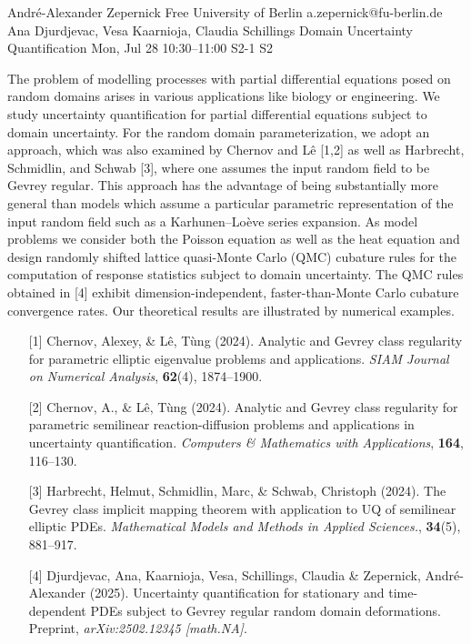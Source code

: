 \begin{talk}
  {André-Alexander Zepernick}%
  {Free University of Berlin}%
  {a.zepernick@fu-berlin.de}%
  {Ana Djurdjevac, Vesa Kaarnioja, Claudia Schillings}%
  {Domain Uncertainty Quantification}%
  {}%
  {Mon, Jul 28 10:30–11:00}%
  {S2-1}%
  {S2}%

The problem of modelling processes with partial differential equations posed on random domains arises in various applications like biology or engineering. We study uncertainty quantification for partial differential equations subject to domain uncertainty. For the random domain parameterization, we adopt an approach, which was also examined by Chernov and L\^{e} [1,2] as well as Harbrecht, Schmidlin, and Schwab [3], where one assumes the input random field to be Gevrey regular. This approach has the advantage of being substantially more general than models which assume a particular parametric representation of the input random field such as a Karhunen--Lo\`eve series expansion. As model problems we consider both the Poisson equation as well as the heat equation and design randomly shifted lattice quasi-Monte Carlo (QMC) cubature rules for the computation of response statistics subject to domain uncertainty. The QMC rules obtained in [4] exhibit dimension-independent, faster-than-Monte Carlo cubature convergence rates. Our theoretical results are illustrated by numerical examples.
\begin{enumerate}
    \item[{[1]}] Chernov, Alexey, \& L\^{e}, Tùng (2024). Analytic and Gevrey class regularity for parametric elliptic eigenvalue problems and applications. \emph{SIAM Journal on Numerical Analysis}, \textbf{62}(4), 1874--1900.
    \item[{[2]}] Chernov, A., \& L\^{e}, Tùng (2024). Analytic and Gevrey class regularity for parametric semilinear reaction-diffusion problems and applications in uncertainty quantification. \emph{Computers \& Mathematics with Applications}, \textbf{164}, 116--130.
    \item[{[3]}] Harbrecht, Helmut, Schmidlin, Marc, \& Schwab, Christoph (2024). The Gevrey class implicit mapping theorem with application to UQ of semilinear elliptic PDEs. \emph{Mathematical Models and Methods in Applied Sciences.}, \textbf{34}(5), 881--917.
    \item[{[4]}] Djurdjevac, Ana, Kaarnioja, Vesa, Schillings, Claudia \& Zepernick, André-Alexander (2025). Uncertainty quantification for stationary and time-dependent PDEs subject to Gevrey regular random domain deformations. Preprint, \emph{arXiv:2502.12345 [math.NA]}.
\end{enumerate}

\medskip

\end{talk}

